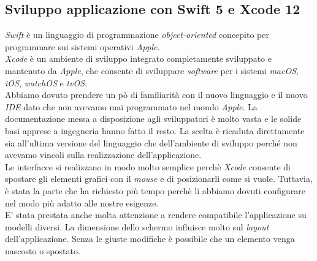 \subsection{Sviluppo applicazione con Swift 5 e Xcode 12}
\textit{Swift} è un linguaggio di programmazione \textit{object-oriented} concepito per programmare sui sistemi operativi \textit{Apple}.\\
\newline
\textit{Xcode} è un ambiente di sviluppo integrato completamente sviluppato e mantenuto da \textit{Apple}, che consente di sviluppare \textit{software} per i sistemi \textit{macOS}, \textit{iOS}, \textit{watchOS} e \textit{tvOS}.\\
\newline
Abbiamo dovuto prendere un pò di familiarità con il nuovo linguaggio e il nuovo \textit{IDE} dato che non avevamo mai programmato nel mondo \textit{Apple}. La documentazione messa a disposizione agli sviluppatori è molto vasta e le solide basi apprese a ingegneria hanno fatto il resto.
La scelta è ricaduta direttamente sia all'ultima versione del linguaggio che dell'ambiente di sviluppo perché non avevamo vincoli sulla realizzazione dell'applicazione.\\
\newline
Le interfacce si realizzano in modo molto semplice perchè \textit{Xcode} consente di spostare gli elementi grafici con il \textit{mouse} e di posizionarli come si vuole. Tuttavia, è stata la parte che ha richiesto più tempo perchè li abbiamo dovuti configurare nel modo più adatto alle nostre esigenze.\\
\newline
E' stata prestata anche molta attenzione a rendere compatibile l'applicazione su modelli diversi. La dimensione dello schermo influisce molto sul \textit{layout} dell'applicazione. Senza le giuste modifiche è possibile che un elemento venga nascosto o spostato.
